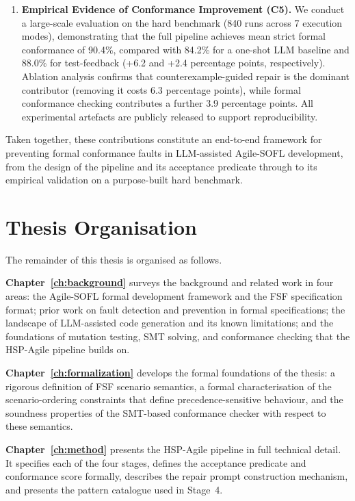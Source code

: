 \begin{enumerate}
\item \textbf{Empirical Evidence of Conformance Improvement (C5).}
We conduct a large-scale evaluation on the hard benchmark (840 runs across 7 execution modes), demonstrating that the full pipeline achieves mean strict formal conformance of 90.4\%, compared with 84.2\% for a one-shot LLM baseline and 88.0\% for test-feedback (+6.2 and +2.4 percentage points, respectively).  Ablation analysis confirms that counterexample-guided repair is the dominant contributor (removing it costs 6.3 percentage points), while formal conformance checking contributes a further 3.9 percentage points.  All experimental artefacts are publicly released to support reproducibility.

\end{enumerate}

Taken together, these contributions constitute an end-to-end framework for preventing formal conformance faults in LLM-assisted Agile-SOFL development, from the design of the pipeline and its acceptance predicate through to its empirical validation on a purpose-built hard benchmark.


\section{Thesis Organisation}
\label{sec:intro:organisation}

The remainder of this thesis is organised as follows.

\textbf{Chapter~\ref{ch:background}} surveys the background and related work in four areas: the Agile-SOFL formal development framework and the FSF specification format; prior work on fault detection and prevention in formal specifications; the landscape of LLM-assisted code generation and its known limitations; and the foundations of mutation testing, SMT solving, and conformance checking that the HSP-Agile pipeline builds on.

\textbf{Chapter~\ref{ch:formalization}} develops the formal foundations of the thesis: a rigorous definition of FSF scenario semantics, a formal characterisation of the scenario-ordering constraints that define precedence-sensitive behaviour, and the soundness properties of the SMT-based conformance checker with respect to these semantics.

\textbf{Chapter~\ref{ch:method}} presents the HSP-Agile pipeline in full technical detail.  It specifies each of the four stages, defines the acceptance predicate and conformance score formally, describes the repair prompt construction mechanism, and presents the pattern catalogue used in Stage~4.

